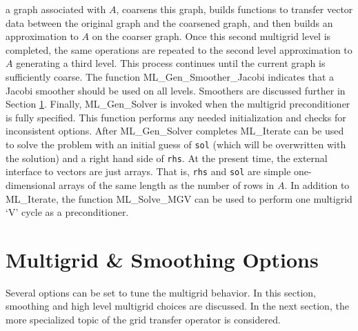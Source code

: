 \documentclass{article}[11pt]
\begin{document}
a graph associated with $A$, coarsens this graph, builds functions
to transfer vector data between the original graph and
the coarsened graph, and then builds an approximation to $A$ on the
coarser graph. Once this second multigrid level is completed, the same
operations are repeated to the second level 
approximation to $A$ generating a third level. This process continues 
until the 
current graph is sufficiently coarse.  The function {\sf ML\_Gen\_Smoother\_Jacobi}
indicates that a Jacobi smoother should be used on all levels.
Smoothers are discussed further in Section \ref{multigrid options}.
Finally, {\sf ML\_Gen\_Solver} is invoked when the multigrid preconditioner
is fully specified. This function performs any needed initialization and
checks for inconsistent options. After {\sf ML\_Gen\_Solver} completes 
{\sf ML\_Iterate} can be used to solve the 
problem with an initial guess of {\tt sol} (which will be overwritten with
the solution) and a right hand side of {\tt rhs}. At the present time, the
external interface to vectors are just arrays. That is, {\tt rhs} and {\tt sol}
are simple one-dimensional arrays of the same length as the number of rows
in $A$. In addition to {\sf ML\_Iterate}, the function {\sf ML\_Solve\_MGV }
can be used to perform one multigrid `V' cycle as a preconditioner.


\section{Multigrid \& Smoothing Options} \label{multigrid options}
Several options can be set to tune the multigrid behavior.  In this
section, smoothing and high level multigrid choices are discussed. In
the next section, the more specialized topic of the grid transfer
operator is considered. 
\end{document}
